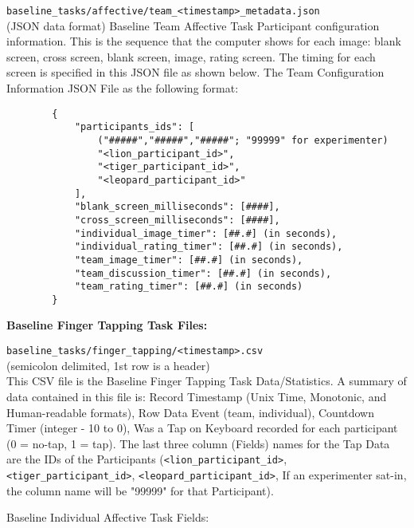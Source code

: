 \begin{description}
\medskip
\item\verb|baseline_tasks/affective/team_<timestamp>_metadata.json|\\
    (JSON data format) Baseline Team Affective Task Participant configuration
    information. This is the sequence that the computer shows for each image:
    blank screen, cross screen, blank screen, image, rating screen. The timing
    for each screen is specified in this JSON file as shown below.  The Team
    Configuration Information JSON File as the following format:
    \begin{verbatim}
        {
            "participants_ids": [
                ("#####","#####","#####"; "99999" for experimenter)
                "<lion_participant_id>",
                "<tiger_participant_id>",
                "<leopard_participant_id>"
            ],
            "blank_screen_milliseconds": [####],
            "cross_screen_milliseconds": [####],
            "individual_image_timer": [##.#] (in seconds),
            "individual_rating_timer": [##.#] (in seconds),
            "team_image_timer": [##.#] (in seconds),
            "team_discussion_timer": [##.#] (in seconds),
            "team_rating_timer": [##.#] (in seconds)
        }
    \end{verbatim}



\bigskip\item\textbf{Baseline Finger Tapping Task Files:}
\medskip
\item\verb|baseline_tasks/finger_tapping/<timestamp>.csv|\\
    (semicolon delimited, 1st row is a header)\\
    This CSV file is the Baseline Finger Tapping Task Data/Statistics. A
    summary of data contained in this file is: Record Timestamp (Unix Time,
    Monotonic, and Human-readable formats), Row Data Event (team, individual),
    Countdown Timer (integer - 10 to 0), Was a Tap on Keyboard recorded for
    each participant (0 = no-tap, 1 = tap). The last three column (Fields)
    names for the Tap Data are the IDs of the Participants
    (\verb|<lion_participant_id>|, \verb|<tiger_participant_id>|,
    \verb|<leopard_participant_id>|, If an experimenter sat-in, the column name
    will be "99999" for that Participant).

\noindent Baseline Individual Affective Task Fields:


\end{description}
